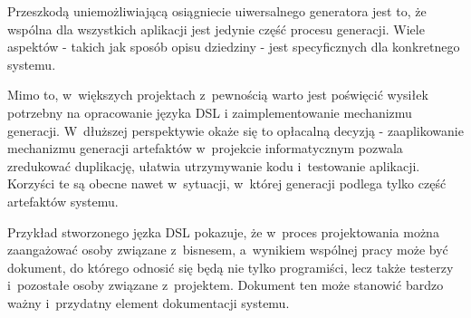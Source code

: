 Przeszkodą uniemożliwiającą osiągniecie uiwersalnego generatora jest to, że wspólna dla wszystkich aplikacji jest jedynie część procesu generacji.
Wiele aspektów - takich jak sposób opisu dziedziny - jest specyficznych dla konkretnego systemu.

Mimo to, w~większych projektach z~pewnością warto jest poświęcić wysiłek potrzebny na opracowanie języka DSL i zaimplementowanie mechanizmu generacji.
W~dłuższej perspektywie okaże się to opłacalną decyzją - zaaplikowanie mechanizmu generacji artefaktów w~projekcie informatycznym pozwala zredukować duplikację, ułatwia utrzymywanie kodu i~testowanie aplikacji.
Korzyści te są obecne nawet w~sytuacji, w~której  generacji podlega tylko część artefaktów systemu.

Przykład stworzonego jęzka DSL pokazuje, że w~proces projektowania można zaangażować osoby związane z~bisnesem, a~wynikiem wspólnej pracy może być dokument, do którego odnosić się będą nie tylko programiści, lecz także testerzy i~pozostałe osoby związane z~projektem.
Dokument ten może stanowić bardzo ważny i~przydatny element dokumentacji systemu.